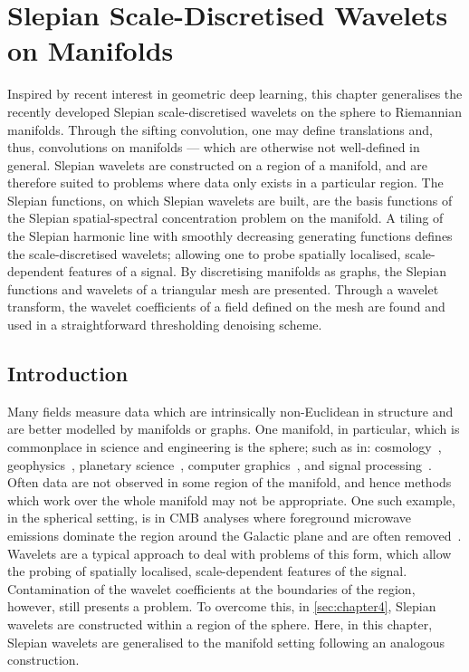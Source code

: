 \chapter{Slepian Scale-Discretised Wavelets on Manifolds}\label{sec:chapter5}

Inspired by recent interest in geometric deep learning, this chapter generalises the recently developed Slepian scale-discretised wavelets on the sphere to Riemannian manifolds.
Through the sifting convolution, one may define translations and, thus, convolutions on manifolds --- which are otherwise not well-defined in general.
Slepian wavelets are constructed on a region of a manifold, and are therefore suited to problems where data only exists in a particular region.
The Slepian functions, on which Slepian wavelets are built, are the basis functions of the Slepian spatial-spectral concentration problem on the manifold.
A tiling of the Slepian harmonic line with smoothly decreasing generating functions defines the scale-discretised wavelets; allowing one to probe spatially localised, scale-dependent features of a signal.
By discretising manifolds as graphs, the Slepian functions and wavelets of a triangular mesh are presented.
Through a wavelet transform, the wavelet coefficients of a field defined on the mesh are found and used in a straightforward thresholding denoising scheme.

\section{Introduction}

Many fields measure data which are intrinsically non-Euclidean in structure and are better modelled by manifolds or graphs.
One manifold, in particular, which is commonplace in science and engineering is the sphere; such as in: cosmology~\cite{Bennett1996}, geophysics~\cite{Simons2006}, planetary science~\cite{Turcotte1981}, computer graphics~\cite{Ramamoorthi2004}, and signal processing~\cite{Roddy2021a}.
Often data are not observed in some region of the manifold, and hence methods which work over the whole manifold may not be appropriate.
One such example, in the spherical setting, is in CMB analyses where foreground microwave emissions dominate the region around the  Galactic plane and are often removed~\cite{Mortlock2002}.
Wavelets are a typical approach to deal with problems of this form, which allow the probing of spatially localised, scale-dependent features of the signal.
Contamination of the wavelet coefficients at the boundaries of the region, however, still presents a problem.
To overcome this, in \cref{sec:chapter4}, Slepian wavelets are constructed within a region of the sphere.
Here, in this chapter, Slepian wavelets are generalised to the manifold setting following an analogous construction.

